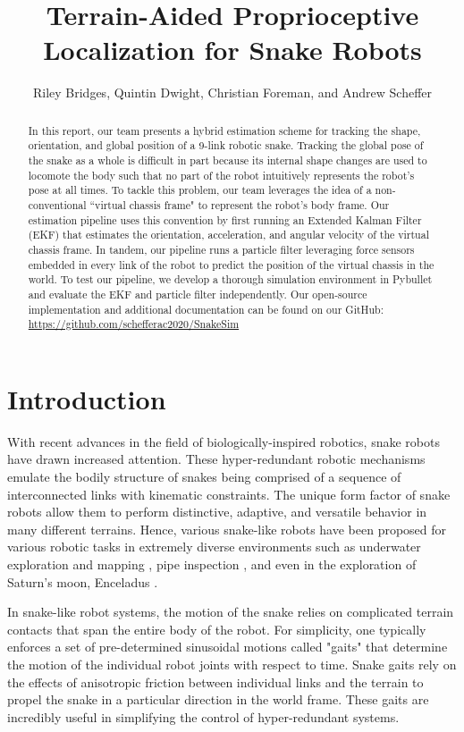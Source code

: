 \documentclass[letterpaper, 10 pt, conference]{ieeeconf}  %
\title{\LARGE \bf
Terrain-Aided Proprioceptive Localization for Snake Robots
}
\author{Riley Bridges, Quintin Dwight, Christian Foreman, and Andrew Scheffer%
}
\begin{document}
\maketitle
\thispagestyle{empty}
\pagestyle{empty}

\begin{abstract}
    In this report, our team presents a hybrid estimation scheme for tracking the shape, orientation, and global position of a 9-link robotic snake. Tracking the global pose of the snake as a whole is difficult in part because its internal shape changes are used to locomote the body such that no part of the robot intuitively represents the robot's pose at all times. To tackle this problem, our team leverages the idea of a non-conventional ``virtual chassis frame" to represent the robot's body frame. Our estimation pipeline uses this convention by first running an Extended Kalman Filter (EKF) that estimates the orientation, acceleration, and angular velocity of the virtual chassis frame. In tandem, our pipeline runs a particle filter leveraging force sensors embedded in every link of the robot to predict the position of the virtual chassis in the world. To test our pipeline, we develop a thorough simulation environment in Pybullet \cite{pybullet} and evaluate the EKF and particle filter independently. Our open-source implementation and additional documentation can be found on our GitHub: \href{https://github.com/schefferac2020/SnakeSim}{https://github.com/schefferac2020/SnakeSim}
\end{abstract}

\section{Introduction}

With recent advances in the field of biologically-inspired robotics, snake robots have drawn increased attention.  These hyper-redundant robotic mechanisms emulate the bodily structure of snakes being comprised of a sequence of interconnected links with kinematic constraints. The unique form factor of snake robots allow them to perform distinctive, adaptive, and versatile behavior in many different terrains. Hence, various snake-like robots have been proposed for various robotic tasks in extremely diverse environments such as underwater exploration and mapping \cite{underwater}, pipe inspection \cite{pipeline_inspection}, and even in the exploration of Saturn's moon, Enceladus \cite{enceladus}. 

In snake-like robot systems, the motion of the snake relies on complicated terrain contacts that span the entire body of the robot. For simplicity, one typically enforces a set of pre-determined sinusoidal motions called "gaits" that determine the motion of the individual robot joints with respect to time. Snake gaits rely on the effects of anisotropic friction between individual links and the terrain to propel the snake in a particular direction in the world frame. These gaits are incredibly useful in simplifying the control of hyper-redundant systems. 
\end{document}
